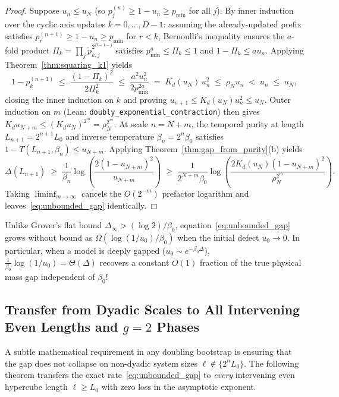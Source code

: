 \documentclass[11pt,a4paper]{article}
\theoremstyle{definition}
\begin{document}
\begin{proof}
Suppose $u_n \le u_N$ (so $p_j^{(n)} \ge 1 - u_n \ge p_{\min}$ for all $j$). By inner induction over the cyclic axis updates $k = 0, \dots, D-1$: assuming the already-updated prefix satisfies $p_r^{(n+1)} \ge 1 - u_n \ge p_{\min}$ for $r < k$, Bernoulli's inequality ensures the $a$-fold product $\Pi_k = \prod_j \tilde{p}_{k,j}^{2^{D-1-j}}$ satisfies $p_{\min}^a \le \Pi_k \le 1$ and $1 - \Pi_k \le a u_n$. Applying Theorem~\ref{thm:squaring_k1} yields
\[
  1 - p_k^{(n+1)} \;\le\; \frac{(1 - \Pi_k)^2}{2 \Pi_k^2}
  \;\le\; \frac{a^2 u_n^2}{2 p_{\min}^{2a}}
  \;=\; K_d(u_N)\, u_n^2 \;\le\; \rho_N u_n \;<\; u_n \;\le\; u_N,
\]
closing the inner induction on $k$ and proving $u_{n+1} \le K_d(u_N) u_n^2 \le u_N$. Outer induction on $m$ (Lean: \texttt{doubly\_exponential\_contraction}) then gives $K_d u_{N+m} \le (K_d u_N)^{2^m} = \rho_N^{2^m}$. At scale $n = N + m$, the temporal purity at length $L_{n+1} = 2^{n+1}L_0$ and inverse temperature $\beta_n = 2^n \beta_0$ satisfies $1 - T(L_{n+1}, \beta_n) \le u_{N+m}$. Applying Theorem~\ref{thm:gap_from_purity}(b) yields
\[
  \Delta(L_{n+1}) \;\ge\; \frac{1}{\beta_n} \log\!\left(\frac{2 (1 - u_{N+m})^2}{u_{N+m}}\right)
  \;\ge\; \frac{1}{2^{N+m}\beta_0} \log\!\left(\frac{2 K_d(u_N)(1-u_{N+m})^2}{\rho_N^{2^m}}\right).
\]
Taking $\liminf_{m \to \infty}$ cancels the $O(2^{-m})$ prefactor logarithm and leaves~\eqref{eq:unbounded_gap} identically.
\end{proof}

Unlike Grover's flat bound $\Delta_\infty > (\log 2)/\beta_0$, equation~\eqref{eq:unbounded_gap} grows without bound as $\Omega(\log(1/u_0)/\beta_0)$ when the initial defect $u_0 \to 0$. In particular, when a model is deeply gapped ($u_0 \sim e^{-\beta_0 \Delta}$), $\frac{1}{\beta_0}\log(1/u_0) = \Theta(\Delta)$ recovers a constant $O(1)$ fraction of the true physical mass gap independent of $\beta_0$!

\subsection{Transfer from Dyadic Scales to All Intervening Even Lengths and \texorpdfstring{$g=2$}{g=2} Phases}

A subtle mathematical requirement in any doubling bootstrap is ensuring that the gap does not collapse on non-dyadic system sizes $\ell \notin \{2^n L_0\}$. The following theorem transfers the exact rate~\eqref{eq:unbounded_gap} to \emph{every} intervening even hypercube length $\ell \ge L_0$ with zero loss in the asymptotic exponent.
\end{document}
